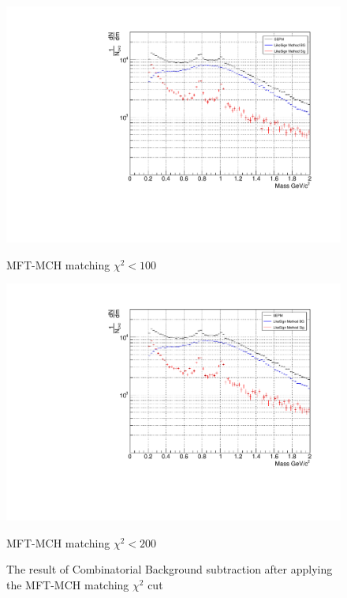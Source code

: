 \begin{figure}[H]
\begin{minipage}{0.45\textwidth}
                \end{minipage}
                \\
                \vspace{1em}
                \begin{minipage}{0.45\textwidth}
                    \centering
                    \includegraphics[width=\textwidth]{fig/3_4_4_CB_chi2_100.pdf}
                    \caption*{MFT-MCH matching $\chi^2 < 100$}
                \end{minipage}
                \hfill
                \begin{minipage}{0.45\textwidth}
                    \centering
                    \includegraphics[width=\textwidth]{fig/3_4_4_CB_chi2_200.pdf}
                    \caption*{MFT-MCH matching $\chi^2 < 200$}
                \end{minipage}
                \caption{The result of Combinatorial Background subtraction after applying the MFT-MCH matching $\chi^2$ cut}
                \label{Analysis:Dimuon:Matching_CB}
            \end{figure}
